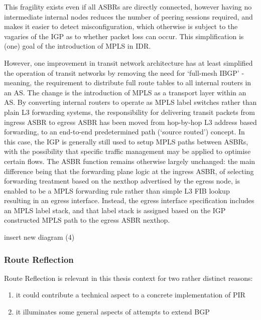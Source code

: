 This fragility exists even if all ASBRs are directly connected, however having no intermediate internal nodes reduces the number of peering sessions required, and makes it easier to detect misconfiguration, which otherwise is subject to the vagaries of the IGP as to whether packet loss can occur.
This simplification is (one) goal of the introduction of MPLS in IDR.

However, one improvement in transit network architecture has at least simplified
the operation of transit networks by removing the need for `full-mesh IBGP' -
meaning, the requirement to distribute full route tables to all internal
routers in an AS.  The change is the introduction of MPLS as a transport layer
within an AS.  By converting internal routers to operate as MPLS label switches
rather than plain L3 forwarding systems, the responsibility for delivering
transit packets from ingress ASBR to egress ASBR has been moved from hop-by-hop
L3 address based forwarding, to an end-to-end predetermined path (`source
routed') concept.  In this case, the IGP is generally still used to setup MPLS
paths between ASBRs, with the possibility that specific traffic management may
be applied to optimise certain flows.  The ASBR function remains otherwise
largely unchanged: the main difference being that the forwarding plane logic at
the ingress ASBR, of selecting forwarding treatment based on the nexthop
advertised by the egress node, is enabled to be a MPLS forwarding rule rather
than simple L3 FIB lookup resulting in an egress interface.  Instead, the
egress interface specification includes an MPLS label stack, and that label
stack is assigned based on the IGP constructed MPLS path to the egress ASBR
nexthop.

{\color{blue} insert new diagram (4)}

\subsubsection{Route Reflection}
Route Reflection is relevant in this thesis context for two rather distinct
reasons:
\begin{enumerate}
	\item it could contribute a technical aspect to a concrete implementation of PIR
	\item it illuminates some general aspects of attempts to extend BGP
\end{enumerate}

